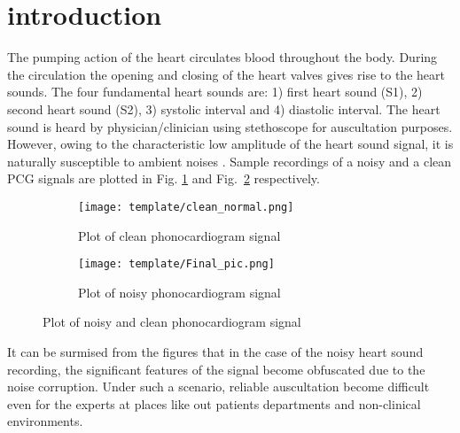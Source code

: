 \documentclass[sigconf,screen]{acmart}
\begin{document}

\maketitle
\section{introduction}

The pumping action of the heart circulates blood throughout the body. During the circulation the opening and closing of the heart valves gives rise to the heart sounds. The four fundamental heart sounds are: 1) first heart sound (S1), 2) second heart sound (S2), 3) systolic interval and 4) diastolic interval. The heart sound is heard by physician/clinician using stethoscope for auscultation purposes. However, owing to the characteristic low amplitude of the heart sound signal, it is naturally susceptible to ambient noises \cite{leal2018noise}. 
Sample recordings of a noisy and a clean PCG signals are plotted in Fig. \ref{fig:clean_normal.png} and Fig.~\ref{fig:clean_murmur.png} respectively. 
\begin{figure}
	\begin{subfigure}{.48\textwidth}
		\centering
		\texttt{[image: template/clean\_normal.png]}
		\caption{Plot of clean phonocardiogram signal}
		\label{fig:clean_normal.png}
	\end{subfigure}
	\begin{subfigure}{.48\textwidth}
		\centering
		\texttt{[image: template/Final\_pic.png]}
		\caption{Plot of noisy phonocardiogram signal}
		\label{fig:clean_murmur.png}
	\end{subfigure}
	\caption{Plot of noisy and clean phonocardiogram signal}
	\label{fig:Typical real-world clean and noisy phonocardiogram signals}
\end{figure}
It can be surmised from the figures that in the case of the noisy heart sound recording, the significant features of the signal become obfuscated due to the noise corruption. Under such a scenario, reliable auscultation become difficult even for the experts at places like out patients departments and non-clinical environments.
\end{document}
